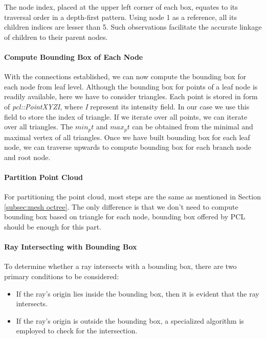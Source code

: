 \documentclass[11pt, a4paper,oneside,chapterprefix=false]{scrbook}
\begin{document}
The node index, placed at the upper left corner of each box, equates to its traversal order in a depth-first pattern. Using node 1 as a reference, all its children indices are lesser than 5. Such observations facilitate the accurate linkage of children to their parent nodes.

\paragraph{Compute Bounding Box of Each Node}

With the connections established, we can now compute the bounding box for each node from leaf level. Although the bounding box for points of a leaf node is readily available, here we have to consider triangles. Each point is stored in form of \textit{pcl::PointXYZI}, where \textit{I} represent its intensity field. In our case we use this field to store the index of triangle. If we iterate over all points, we can iterate over all triangles. The $min_pt$ and $max_pt$ can be obtained from the minimal and maximal vertex of all triangles. Once we have built bounding box for each leaf node, we can traverse upwards to compute bounding box for each branch node and root node. 

\paragraph{Partition Point Cloud}

For partitioning the point cloud, most steps are the same as mentioned in Section \ref{subsec:mesh octree}. The only difference is that we don't need to compute bounding box based on triangle for each node, bounding box offered by PCL should be enough for this part.

\paragraph{Ray Intersecting with Bounding Box}

To determine whether a ray intersects with a bounding box, there are two primary conditions to be considered:

\begin{itemize}
    \item If the ray's origin lies inside the bounding box, then it is evident that the ray intersects.
    \item If the ray's origin is outside the bounding box, a specialized algorithm is employed to check for the intersection.
\end{itemize}
\end{document}
